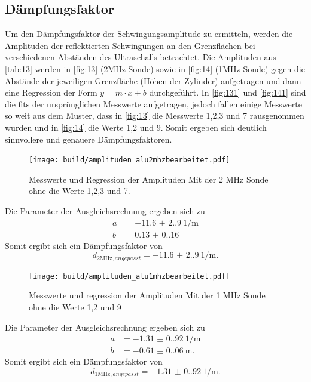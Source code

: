 \subsection{Dämpfungsfaktor}
Um den Dämpfungsfaktor der Schwingungsamplitude zu ermitteln, werden die
Amplituden der reflektierten Schwingungen an den Grenzflächen bei verschiedenen
Abständen des Ultraschalls betrachtet. Die Amplituden aus \autoref{tab:13} werden
in \autoref{fig:13} (2$\unit{\mega\hertz}$ Sonde) sowie in \autoref{fig:14} 
(1$\unit{\mega\hertz}$ Sonde) gegen die Abstände der jeweiligen Grenzfläche 
(Höhen der Zylinder) aufgetragen und dann eine Regression der Form 
$y = m \cdot x + b$  durchgeführt. In \autoref{fig:131} und \autoref{fig:141} sind
die fits der ursprünglichen Messwerte aufgetragen, jedoch fallen einige
Messwerte so weit aus dem Muster, dass in \autoref{fig:13} die Messwerte 
1,2,3 und 7 rausgenommen wurden und in \autoref{fig:14} die Werte 1,2 und 9.
Somit ergeben sich deutlich sinnvollere und genauere Dämpfungsfaktoren.
 
\begin{figure}[H]
    \centering
    \caption{Messwerte und Regression der Amplituden Mit der 2 $\unit{\mega\hertz}$ Sonde ohne die Werte 1,2,3 und 7.}
    \label{fig:13}
    \texttt{[image: build/amplituden\_alu2mhzbearbeitet.pdf]}
\end{figure}
Die Parameter der Ausgleichsrechnung ergeben sich zu 
\begin{align*}
    a &= \qty{-11.6(2.9)}{1 \per\meter}\\
    b &= \qty{0.13(0.16)}{}
\end{align*}
Somit ergibt sich ein Dämpfungsfaktor von 
\begin{equation}
    d_{2\unit{\mega\hertz},angepasst} = \qty{-11.6(2.9)}{1 \per\meter}.
\end{equation}

\begin{figure}[H]
    \centering
    \caption{Messwerte und regression der Amplituden Mit der 1 $\unit{\mega\hertz}$ Sonde ohne die Werte 1,2 und 9}
    \label{fig:14}
    \texttt{[image: build/amplituden\_alu1mhzbearbeitet.pdf]}
\end{figure}
\noindent Die Parameter der Ausgleichsrechnung ergeben sich zu 
\begin{align*}
    a &= \qty{-1.31(0.92)}{1 \per\meter}\\
    b &= \qty{-0.61(0.06)}{\meter}.
\end{align*}
Somit ergibt sich ein Dämpfungsfaktor von 
\begin{equation}
    d_{1 \unit{\mega\hertz},angepasst} = \qty{-1.31(0.92)}{1 \per\meter}.
\end{equation}

